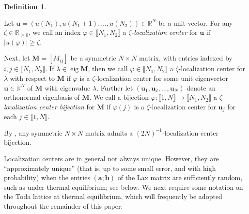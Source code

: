 \documentclass{amsart}
\numberwithin{equation}{section}
\DeclareMathOperator{\eig}{eig}
\theoremstyle{remark}
\theoremstyle{definition}
\newtheorem{definition}[thm]{Definition}
\begin{document}
	\begin{definition}
		\label{ucenter}
		
		Let $\bm{u} = ( u(N_1), u(N_1+1), \ldots , u(N_2) ) \in \mathbb{R}^N$ be a unit vector. For any $\zeta \in \mathbb{R}_{\ge 0}$, we call an index $\varphi \in \llbracket N_1, N_2 \rrbracket$ a \emph{$\zeta$-localization center} for $\bm{u}$ if $| u(\varphi) | \ge \zeta$. 
		
		Next, let $\bm{M} = [M_{ij}]$ be a symmetric $N \times N$ matrix, with entries indexed by $i, j \in \llbracket N_1, N_2 \rrbracket$. If $\lambda \in \eig \bm{M}$, then we call $\varphi \in \llbracket N_1, N_2 \rrbracket$ a $\zeta$-localization center for $\lambda$ with respect to $\bm{M}$ if $\varphi$ is a $\zeta$-localization center for some unit eigenvector $\bm{u} \in \mathbb{R}^N$ of $\bm{M}$ with eigenvalue $\lambda$. Further let $(\bm{u}_1, \bm{u}_2, \ldots , \bm{u}_N)$ denote an orthonormal eigenbasis of $\bm{M}$. We call a bijection $\varphi : \llbracket 1, N \rrbracket \rightarrow \llbracket N_1, N_2 \rrbracket$ a \emph{$\zeta$-localization center bijection} for $\bm{M}$ if $\varphi(j)$ is a $\zeta$-localization center for $\bm{u}_j$ for each $j \in \llbracket 1, N \rrbracket$.
		
		By {\cite[Lemma 2.7]{LC}}, any symmetric $N \times N$ matrix admits a $(2N)^{-1}$-localization center bijection.
		
	\end{definition} 
	
	Localization centers are in general not always unique. However, they are ``approximately unique'' (that is, up to some small error, and with high probability) when the entries $(\bm{a};\bm{b})$ of the Lax matrix are sufficiently random, such as under thermal equilibrium; see  below. We next require some notation on the Toda lattice at thermal equilibrium, which will frequently be adopted throughout the remainder of this paper. 
		
\end{document}
